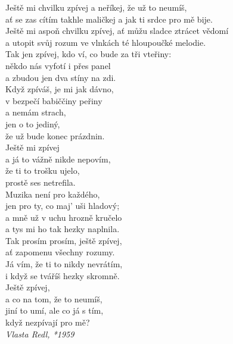 
\begin{center}
	\selectfont
	\vspace*{30mm}
	Ještě mi chvilku zpívej a neříkej, že už to neumíš,\\
	ať se zas cítím takhle maličkej a jak ti srdce pro mě bije.\\
	Ještě mi aspoň chvilku zpívej, ať můžu sladce ztrácet vědomí\\
	a utopit svůj rozum ve vlnkách té hloupoučké melodie.\\
	
	Tak jen zpívej, kdo ví, co bude za tři vteřiny:\\
	někdo nás vyfotí i přes panel\\
	a zbudou jen dva stíny na zdi.\\
	Když zpíváš, je mi jak dávno,\\
	v bezpečí babiččiny peřiny\\
	a nemám strach,\\
	jen o to jediný,\\
	že už bude konec prázdnin.\\
	\vspace{3mm}
	Ještě mi zpívej\\
	a já to vážně nikde nepovím,\\
	že ti to trošku ujelo,\\
	prostě ses netrefila.\\
	Muzika není pro každého,\\
	jen pro ty, co maj' uši hladový;\\
	a mně už v uchu hrozně kručelo\\
	a tys mi ho tak hezky naplnila.\\
	\vspace{3mm}
	Tak prosím prosím, ještě zpívej,\\
	ať zapomenu všechny rozumy.\\
	Já vím, že ti to nikdy nevrátím,\\
	i když se tváříš hezky skromně.\\
	Ještě zpívej,\\
	a co na tom, že to neumíš,\\
	jiní to umí, ale co já s tím,\\
	když nezpívají pro mě?\\
	\vspace{5mm}
	\emph{Vlasta Redl, *1959}
\end{center}
\newpage